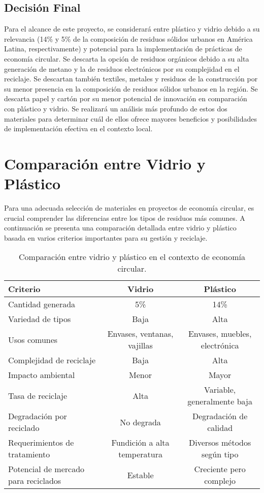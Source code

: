 \subsection{Decisión Final}
Para el alcance de este proyecto, se considerará entre plástico y vidrio debido a su relevancia (14\% y 5\% de la composición de residuos sólidos urbanos en América Latina, respectivamente) y potencial para la implementación de prácticas de economía circular. Se descarta la opción de residuos orgánicos debido a su alta generación de metano y la de residuos electrónicos por su complejidad en el reciclaje. Se descartan también textiles, metales y residuos de la construcción por su menor presencia en la composición de residuos sólidos urbanos en la región. Se descarta papel y cartón por su menor potencial de innovación en comparación con plástico y vidrio.
Se realizará un análisis más profundo de estos dos materiales para determinar cuál de ellos ofrece mayores beneficios y posibilidades de implementación efectiva en el contexto local.

\section{Comparación entre Vidrio y Plástico}

Para una adecuada selección de materiales en proyectos de economía circular, es crucial comprender las diferencias entre los tipos de residuos más comunes. A continuación se presenta una comparación detallada entre vidrio y plástico basada en varios criterios importantes para su gestión y reciclaje.

\begin{table}[h!]
\centering
\begin{tabular}{|l|c|c|}
\hline
\textbf{Criterio} & \textbf{Vidrio} & \textbf{Plástico} \\ \hline
Cantidad generada & 5\% & 14\% \\ \hline
Variedad de tipos & Baja & Alta \\ \hline
Usos comunes & Envases, ventanas, vajillas & Envases, muebles, electrónica \\ \hline
Complejidad de reciclaje & Baja & Alta \\ \hline
Impacto ambiental & Menor & Mayor \\ \hline
Tasa de reciclaje & Alta & Variable, generalmente baja \\ \hline
Degradación por reciclado & No degrada & Degradación de calidad \\ \hline
Requerimientos de tratamiento & Fundición a alta temperatura & Diversos métodos según tipo \\ \hline
Potencial de mercado para reciclados & Estable & Creciente pero complejo \\ \hline
\end{tabular}
\caption{Comparación entre vidrio y plástico en el contexto de economía circular.}
\label{tab:glass-vs-plastic}
\end{table}

